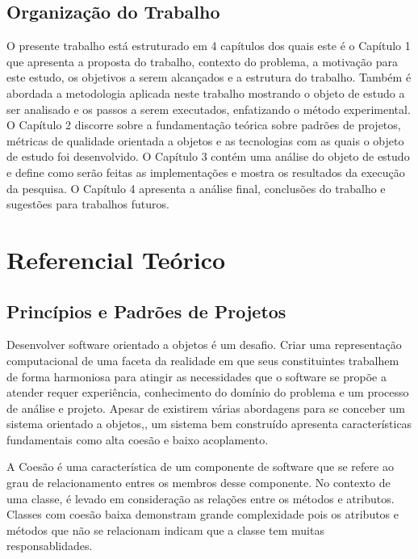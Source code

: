 \documentclass[conference]{IEEEtran}
\begin{document}
\subsection{Organização do Trabalho}

O presente trabalho está estruturado em 4 capítulos dos quais este é o
Capítulo 1 que apresenta a proposta do trabalho, contexto do problema, a
motivação para este estudo, os objetivos a serem alcançados e a estrutura do
trabalho. Também é abordada a metodologia aplicada neste trabalho mostrando o
objeto de estudo a ser analisado e os passos a serem executados, enfatizando o
método experimental.
O Capítulo 2 discorre sobre a fundamentação teórica sobre padrões de projetos,
métricas de qualidade orientada a objetos e as tecnologias com as quais o objeto
de estudo foi desenvolvido.
O Capítulo 3 contém uma análise do objeto de estudo e define como serão feitas
as implementações e mostra os resultados da execução da pesquisa.
O Capítulo 4 apresenta a análise final, conclusões do trabalho e sugestões para
trabalhos futuros.


\section{Referencial Teórico}

\subsection{Princípios e Padrões de Projetos}


Desenvolver software orientado a objetos é um desafio. Criar uma representação
computacional de uma faceta da realidade em que seus constituintes trabalhem de
forma harmoniosa para atingir as necessidades que o software se propõe a
atender requer experiência, conhecimento do domínio do problema e um processo de
análise e projeto. Apesar de existirem várias abordagens para se conceber um
sistema orientado a objetos\cite{evans2004ddd},\cite{gomma11}, um sistema bem
construído apresenta características fundamentais como alta coesão e
baixo acoplamento.

A Coesão é uma característica de um componente de software que se refere ao grau
de relacionamento entres os membros desse componente. No contexto de uma classe,
é levado em consideração as relações entre os métodos e atributos. Classes com
coesão baixa demonstram grande complexidade pois os atributos e métodos que não
se relacionam indicam que a classe tem muitas responsablidades.
\end{document}
